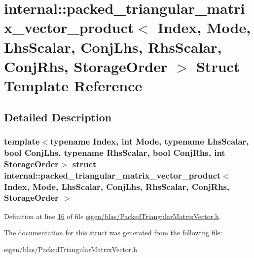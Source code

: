 \hypertarget{structinternal_1_1packed__triangular__matrix__vector__product}{}\section{internal\+:\+:packed\+\_\+triangular\+\_\+matrix\+\_\+vector\+\_\+product$<$ Index, Mode, Lhs\+Scalar, Conj\+Lhs, Rhs\+Scalar, Conj\+Rhs, Storage\+Order $>$ Struct Template Reference}
\label{structinternal_1_1packed__triangular__matrix__vector__product}


\subsection{Detailed Description}
\subsubsection*{template$<$typename Index, int Mode, typename Lhs\+Scalar, bool Conj\+Lhs, typename Rhs\+Scalar, bool Conj\+Rhs, int Storage\+Order$>$\newline
struct internal\+::packed\+\_\+triangular\+\_\+matrix\+\_\+vector\+\_\+product$<$ Index, Mode, Lhs\+Scalar, Conj\+Lhs, Rhs\+Scalar, Conj\+Rhs, Storage\+Order $>$}



Definition at line \hyperlink{eigen_2blas_2_packed_triangular_matrix_vector_8h_source_l00016}{16} of file \hyperlink{eigen_2blas_2_packed_triangular_matrix_vector_8h_source}{eigen/blas/\+Packed\+Triangular\+Matrix\+Vector.\+h}.



The documentation for this struct was generated from the following file\+:\begin{DoxyCompactItemize}
\item 
eigen/blas/\+Packed\+Triangular\+Matrix\+Vector.\+h\end{DoxyCompactItemize}
